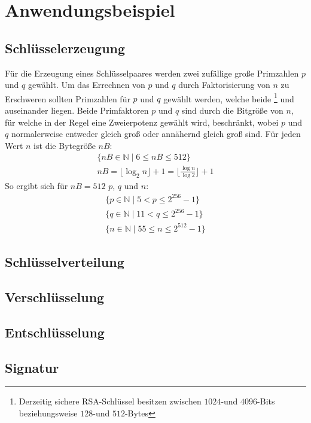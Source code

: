 \chapter{Anwendungsbeispiel}

\section{Schlüsselerzeugung}

Für die Erzeugung eines Schlüsselpaares werden zwei zufällige große Primzahlen $p$ und $q$ gewählt.
Um das Errechnen von $p$ und $q$ durch Faktorisierung von $n$ zu Erschweren sollten Primzahlen für $p$ und $q$ gewählt werden, welche beide \footnote{Derzeitig sichere RSA-Schlüssel besitzen zwischen $1024$-und $4096$-Bits beziehungsweise $128$-und $512$-Bytes} und  auseinander liegen. Beide Primfaktoren $p$ und $q$ sind durch die Bitgröße von $n$, für welche in der Regel eine Zweierpotenz gewählt wird, beschränkt, wobei $p$ und $q$ normalerweise entweder gleich groß oder annähernd gleich groß sind. Für jeden Wert $n$ ist die Bytegröße $nB$:
\begin{align}
  \{nB \in \mathbb{N}\;|\; 6 \le nB \le 512 \}\\
  nB=\lfloor\log_2{n}\rfloor+1=\lfloor\frac{\log{n}}{\log{2}}\rfloor+1
\end{align}
So ergibt sich für $nB=512$ $p$, $q$ und $n$:
\begin{align}
\{p \in \mathbb{N}\;|\; 5 < p \le 2^{256}-1 \}\\
\{q \in \mathbb{N}\;|\; 11 < q \le 2^{256}-1 \}\\
\{n \in \mathbb{N}\;|\; 55 \le n \le 2^{512}-1 \}
\end{align}

\newpage
\section{Schlüsselverteilung}
\newpage
\section{Verschlüsselung}
\newpage
\section{Entschlüsselung}
\newpage
\section{Signatur}
